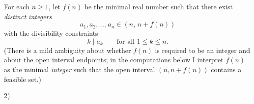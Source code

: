 For each $n\ge 1$, let $f(n)$ be the minimal real number such that there exist \emph{distinct integers}
\[
a_1,a_2,\dots,a_n\in (n,\,n+f(n))
\]
with the divisibility constraints
\[
 k\mid a_k\qquad\text{for all }1\le k\le n.
\]
(There is a mild ambiguity about whether $f(n)$ is required to be an integer and about the open interval endpoints; in the computations below I interpret $f(n)$ as the minimal \emph{integer} such that the open interval $(n,n+f(n))$ contains a feasible set.)

2)
